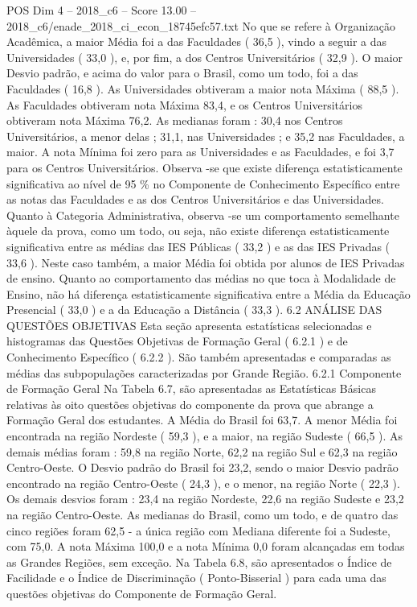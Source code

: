 \begin{textsample}{POS Dim 4 – 2018\_c6 – Score 13.00 – 2018\_c6/enade\_2018\_ci\_econ\_18745efc57.txt}
No que se refere à Organização Acadêmica, a maior Média foi a das Faculdades ( 36,5 ), vindo a seguir a das Universidades ( 33,0 ), e, por fim, a dos Centros Universitários ( 32,9 ).
O maior Desvio padrão, e acima do valor para o Brasil, como um todo, foi a das Faculdades ( 16,8 ).
As Universidades obtiveram a maior nota Máxima ( 88,5 ).
As Faculdades obtiveram nota Máxima 83,4, e os Centros Universitários obtiveram nota Máxima 76,2.
As medianas foram : 30,4 nos Centros Universitários, a menor delas ; 31,1, nas Universidades ; e 35,2 nas Faculdades, a maior.
A nota Mínima foi zero para as Universidades e as Faculdades, e foi 3,7 para os Centros Universitários.
Observa -se que existe diferença estatisticamente significativa ao nível de 95 \% no Componente de Conhecimento Específico entre as notas das Faculdades e as dos Centros Universitários e das Universidades.
Quanto à Categoria Administrativa, observa -se um comportamento semelhante àquele da prova, como um todo, ou seja, não existe diferença estatisticamente significativa entre as médias das IES Públicas ( 33,2 ) e as das IES Privadas ( 33,6 ).
Neste caso também, a maior Média foi obtida por alunos de IES Privadas de ensino.
Quanto ao comportamento das médias no que toca à Modalidade de Ensino, não há diferença estatisticamente significativa entre a Média da Educação Presencial ( 33,0 ) e a da Educação a Distância ( 33,3 ). 6.2 ANÁLISE DAS QUESTÕES OBJETIVAS Esta seção apresenta estatísticas selecionadas e histogramas das Questões Objetivas de Formação Geral ( 6.2.1 ) e de Conhecimento Específico ( 6.2.2 ).
São também apresentadas e comparadas as médias das subpopulações caracterizadas por Grande Região. 6.2.1 Componente de Formação Geral Na Tabela 6.7, são apresentadas as Estatísticas Básicas relativas às oito questões objetivas do componente da prova que abrange a Formação Geral dos estudantes.
A Média do Brasil foi 63,7.
A menor Média foi encontrada na região Nordeste ( 59,3 ), e a maior, na região Sudeste ( 66,5 ).
As demais médias foram : 59,8 na região Norte, 62,2 na região Sul e 62,3 na região Centro-Oeste.
O Desvio padrão do Brasil foi 23,2, sendo o maior Desvio padrão encontrado na região Centro-Oeste ( 24,3 ), e o menor, na região Norte ( 22,3 ).
Os demais desvios foram : 23,4 na região Nordeste, 22,6 na região Sudeste e 23,2 na região Centro-Oeste.
As medianas do Brasil, como um todo, e de quatro das cinco regiões foram 62,5 - a única região com Mediana diferente foi a Sudeste, com 75,0.
A nota Máxima 100,0 e a nota Mínima 0,0 foram alcançadas em todas as Grandes Regiões, sem exceção.
Na Tabela 6.8, são apresentados o Índice de Facilidade e o Índice de Discriminação ( Ponto-Bisserial ) para cada uma das questões objetivas do Componente de Formação Geral.

\end{textsample}
